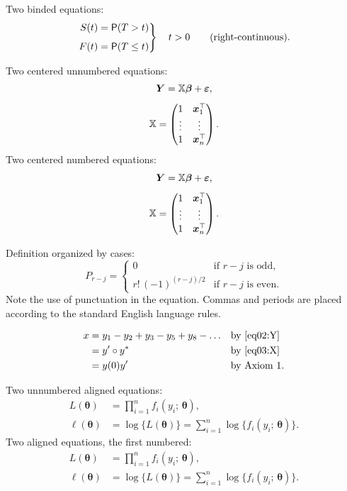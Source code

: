 Two binded equations:
\begin{equation}\label{eq01:FS}
\left.
\begin{aligned}
S(t) &= \operatorname{\textsf{P}}(T > t) \\[1ex]
F(t) &= \operatorname{\textsf{P}}(T \leq t)
\end{aligned}
\right\}
\quad t>0 \qquad \text{(right-continuous).}
\end{equation}

Two centered unnumbered equations:
\begin{gather*}
\bm Y = \mathbb{X}\bm\beta + \bm\varepsilon, \\[1ex]
\mathbb{X} = \begin{pmatrix} 1 & \bm x_1^\top \\ \vdots & \vdots \\ 1 &
  \bm x_n^\top \end{pmatrix}.
\end{gather*}
Two centered numbered equations:
\begin{gather}
\bm Y = \mathbb{X}\bm\beta + \bm\varepsilon, \label{eq02:Y}\\[1ex]
\mathbb{X} = \begin{pmatrix} 1 & \bm x_1^\top \label{eq03:X}\\ \vdots & \vdots \\ 1 &
  \bm x_n^\top \end{pmatrix}.
\end{gather}

Definition organized by cases:
\[
P_{r-j}=
\begin{cases}
0 & \text{if $r-j$ is odd},\\
r!\,(-1)^{(r-j)/2} & \text{if $r-j$ is even}.
\end{cases}
\]
Note the use of punctuation in the equation. Commas and periods are
placed according to the standard English language rules.

\begin{align}
x& = y_1-y_2+y_3-y_5+y_8-\dots && \text{by \eqref{eq02:Y}} \nonumber\\
& = y'\circ y^* && \text{by \eqref{eq03:X}} \nonumber\\
& = y(0) y' && \text {by Axiom 1.}
\end{align}

Two unnumbered aligned equations:
\begin{align*}
L(\bm\theta) &= \prod_{i=1}^n f_i(y_i;\,\bm\theta), \\
\ell(\bm\theta) &= \log\bigl\{L(\bm\theta)\bigr\} = 
\sum_{i=1}^n \log\bigl\{f_i(y_i;\,\bm\theta)\bigr\}.
\end{align*}
Two aligned equations, the first numbered:
\begin{align}
L(\bm\theta) &= \prod_{i=1}^n f_i(y_i;\,\bm\theta), \label{eq01:L} \\
\ell(\bm\theta) &= \log\bigl\{L(\bm\theta)\bigr\} = 
\sum_{i=1}^n \log\bigl\{f_i(y_i;\,\bm\theta)\bigr\}. \nonumber
\end{align}

